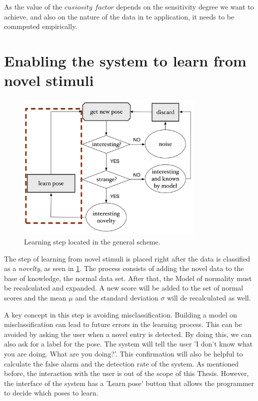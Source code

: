 As the value of the $cusiosity$ $factor$ depends on the sensitivity degree we want to achieve, and also on the nature of the data in te application, it needs to be commputed empirically.

\section{Enabling the system to learn from novel stimuli}

\begin{figure}[h]
\includegraphics[width=9cm]{Figures/Esquema_learn}
\centering
\caption{Learning step located in the general scheme. \label{fig:scheme_learn}}
\end{figure}

The step of learning from novel stimuli is placed right after the data is classified as a \emph{novelty}, as seen in \ref{fig:scheme_learn}. The process consists of adding the novel data to the base of knowledge, the normal data set. After that, the Model of normality must be recalculated and expanded. A new score will be added to the set of normal scores and the mean $\mu$ and the standard deviation $\sigma$ will de recalculated as well.

A key concept in this step is avoiding misclassification. Building a model on misclassification can lead to future errors in the learning process. This can be avoided by asking the user when a novel entry is detected. By doing this, we can also ask for a label for the pose. The system will tell the user 'I don't know what you are doing. What are you doing?'. This confirmation will also be helpful to calculate the false alarm and the detection rate of the system. As mentioned before, the interaction with the user is out of the scope of this Thesis. However, the interface of the system has a 'Learn pose' button that allows the programmer to decide which poses to learn.

